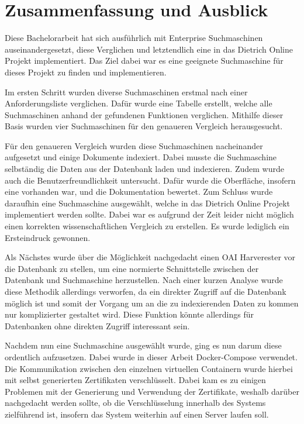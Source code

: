 \chapter{Zusammenfassung und Ausblick}

Diese Bachelorarbeit hat sich ausführlich mit Enterprise Suchmaschinen auseinandergesetzt, diese Verglichen und letztendlich eine in das Dietrich Online Projekt implementiert. Das Ziel dabei war es eine geeignete Suchmaschine für dieses Projekt zu finden und implementieren.  

Im ersten Schritt wurden diverse Suchmaschinen erstmal nach einer Anforderungsliste verglichen. Dafür wurde eine Tabelle erstellt, welche alle Suchmaschinen anhand der gefundenen Funktionen verglichen. Mithilfe dieser Basis wurden vier Suchmaschinen für den genaueren Vergleich herausgesucht.

Für den genaueren Vergleich wurden diese Suchmaschinen nacheinander aufgesetzt und einige Dokumente indexiert. Dabei musste die Suchmaschine selbständig die Daten aus der Datenbank laden und indexieren. Zudem wurde auch die Benutzerfreundlichkeit untersucht. Dafür wurde die Oberfläche, insofern eine vorhanden war, und die Dokumentation bewertet. Zum Schluss wurde daraufhin eine Suchmaschine ausgewählt, welche in das Dietrich Online Projekt implementiert werden sollte. Dabei war es aufgrund der Zeit leider nicht möglich einen korrekten wissenschaftlichen Vergleich zu erstellen. Es wurde lediglich ein Ersteindruck gewonnen.

Als Nächstes wurde über die Möglichkeit nachgedacht einen OAI Harverester vor die Datenbank zu stellen, um eine normierte Schnittstelle zwischen der Datenbank und Suchmaschine herzustellen. Nach einer kurzen Analyse wurde diese Methodik allerdings verworfen, da ein direkter Zugriff auf die Datenbank möglich ist und somit der Vorgang um an die zu indexierenden Daten zu kommen nur komplizierter gestaltet wird. Diese Funktion könnte allerdings für Datenbanken ohne direkten Zugriff interessant sein. 

Nachdem nun eine Suchmaschine ausgewählt wurde, ging es nun darum diese ordentlich aufzusetzen. Dabei wurde in dieser Arbeit Docker-Compose verwendet. Die Kommunikation zwischen den einzelnen virtuellen Containern wurde hierbei mit selbst generierten Zertifikaten verschlüsselt. Dabei kam es zu einigen Problemen mit der Generierung und Verwendung der Zertifikate, weshalb darüber nachgedacht werden sollte, ob die Verschlüsselung innerhalb des Systems zielführend ist, insofern das System weiterhin auf einen Server laufen soll. 

